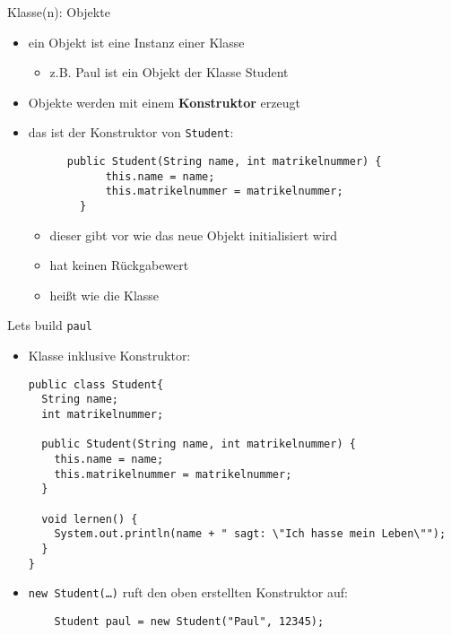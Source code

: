 \documentclass{../../presentation}
\begin{document}
\begin{frame}[fragile]{Klasse(n): Objekte}
	\begin{itemize}
		\item ein Objekt ist eine Instanz einer Klasse
		      \begin{itemize}
			      \item[\textbullet] z.B. Paul ist ein Objekt der Klasse Student
		      \end{itemize}
		\item<2-> Objekte werden mit einem \textbf{Konstruktor} erzeugt
		\item<3-> das ist der Konstruktor von \texttt{Student}:
		      \begin{verbatim}
      public Student(String name, int matrikelnummer) {
		    this.name = name;
		    this.matrikelnummer = matrikelnummer;
		}
      \end{verbatim}
		      \begin{itemize}
			      \item<4->[\textbullet]dieser gibt vor wie das neue Objekt initialisiert wird
			      \item<5->[\textbullet]hat keinen Rückgabewert
			      \item<6->[\textbullet]heißt wie die Klasse
		      \end{itemize}
	\end{itemize}
\end{frame}



\begin{frame}[fragile]{Let\textquotesingle s build \texttt{paul}}
	\begin{itemize}

		\item Klasse inklusive Konstruktor:
		      \begin{verbatim}
public class Student{
  String name;
  int matrikelnummer;
    
  public Student(String name, int matrikelnummer) {
    this.name = name;
    this.matrikelnummer = matrikelnummer;
  }

  void lernen() {
    System.out.println(name + " sagt: \"Ich hasse mein Leben\"");
  }
}
  \end{verbatim}
		\item<2->\texttt{new Student(\dots)} ruft den oben erstellten Konstruktor auf:
		      \begin{verbatim}
    Student paul = new Student("Paul", 12345);
  \end{verbatim}
	\end{itemize}
\end{frame}
\end{document}
